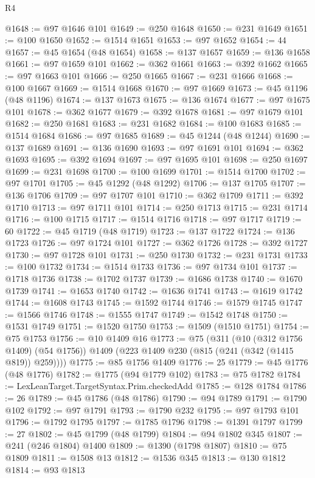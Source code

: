 \begin{lexlean}{R4}
\begin{coremodule}
@1648 := @97 @1646 @101
@1649 := @250 @1648
@1650 := @231 @1649
@1651 := @100 @1650
@1652 := @1514 @1651
@1653 := @97 @1652
@1654 := 44
@1657 := @45 @1654 (@48 @1654)
@1658 := @137 @1657
@1659 := @136 @1658
@1661 := @97 @1659 @101
@1662 := @362 @1661
@1663 := @392 @1662
@1665 := @97 @1663 @101
@1666 := @250 @1665
@1667 := @231 @1666
@1668 := @100 @1667
@1669 := @1514 @1668
@1670 := @97 @1669
@1673 := @45 @1196 (@48 @1196)
@1674 := @137 @1673
@1675 := @136 @1674
@1677 := @97 @1675 @101
@1678 := @362 @1677
@1679 := @392 @1678
@1681 := @97 @1679 @101
@1682 := @250 @1681
@1683 := @231 @1682
@1684 := @100 @1683
@1685 := @1514 @1684
@1686 := @97 @1685
@1689 := @45 @1244 (@48 @1244)
@1690 := @137 @1689
@1691 := @136 @1690
@1693 := @97 @1691 @101
@1694 := @362 @1693
@1695 := @392 @1694
@1697 := @97 @1695 @101
@1698 := @250 @1697
@1699 := @231 @1698
@1700 := @100 @1699
@1701 := @1514 @1700
@1702 := @97 @1701
@1705 := @45 @1292 (@48 @1292)
@1706 := @137 @1705
@1707 := @136 @1706
@1709 := @97 @1707 @101
@1710 := @362 @1709
@1711 := @392 @1710
@1713 := @97 @1711 @101
@1714 := @250 @1713
@1715 := @231 @1714
@1716 := @100 @1715
@1717 := @1514 @1716
@1718 := @97 @1717
@1719 := 60
@1722 := @45 @1719 (@48 @1719)
@1723 := @137 @1722
@1724 := @136 @1723
@1726 := @97 @1724 @101
@1727 := @362 @1726
@1728 := @392 @1727
@1730 := @97 @1728 @101
@1731 := @250 @1730
@1732 := @231 @1731
@1733 := @100 @1732
@1734 := @1514 @1733
@1736 := @97 @1734 @101
@1737 := @1718 @1736
@1738 := @1702 @1737
@1739 := @1686 @1738
@1740 := @1670 @1739
@1741 := @1653 @1740
@1742 := @1636 @1741
@1743 := @1619 @1742
@1744 := @1608 @1743
@1745 := @1592 @1744
@1746 := @1579 @1745
@1747 := @1566 @1746
@1748 := @1555 @1747
@1749 := @1542 @1748
@1750 := @1531 @1749
@1751 := @1520 @1750
@1753 := @1509 (@1510 @1751)
@1754 := @75 @1753
@1756 := @10 @1409 @16
@1773 := @75
    (@311
      (@10 (@312 @1756 @1409) (@54 @1756))
      @1409
      (@223 @1409 @230 (@815 (@241 (@342 (@1415 @819)) @259))))
@1775 := @85 @1756 @1409
@1776 := 25
@1779 := @45 @1776 (@48 @1776)
@1782 := @1775 (@94 @1779 @102)
@1783 := @75 @1782
@1784 := LexLeanTarget.TargetSyntax.Prim.checkedAdd
@1785 := @128 @1784
@1786 := 26
@1789 := @45 @1786 (@48 @1786)
@1790 := @94 @1789
@1791 := @1790 @102
@1792 := @97 @1791
@1793 := @1790 @232
@1795 := @97 @1793 @101
@1796 := @1792 @1795
@1797 := @1785 @1796
@1798 := @1391 @1797
@1799 := 27
@1802 := @45 @1799 (@48 @1799)
@1804 := @94 @1802 @345
@1807 := @241 (@246 @1804) @1400
@1809 := @1390 (@1798 @1807)
@1810 := @75 @1809
@1811 := @1508 @13
@1812 := @1536 @345
@1813 := @130 @1812
@1814 := @93 @1813

\end{coremodule}
\end{lexlean}

